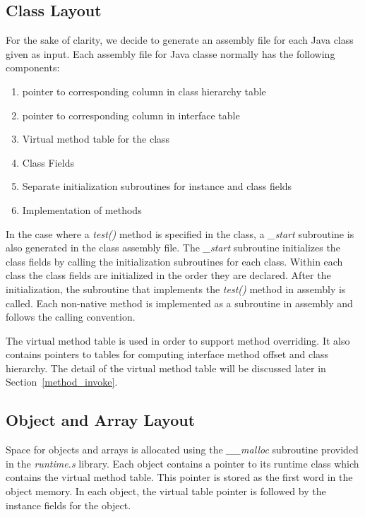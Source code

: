 \documentclass[a4paper, notitlepage]{report}
\begin{document}
\subsection{Class Layout}
\label{class_layout}
For the sake of clarity, we decide to generate an assembly file for each Java class given as input. Each assembly file for Java classe normally has the following components:
\begin{enumerate}
\item pointer to corresponding column in class hierarchy table
\item pointer to corresponding column in interface table
\item Virtual method table for the class
\item Class Fields
\item Separate initialization subroutines for instance and class fields
\item Implementation of methods
\end{enumerate}

In the case where a \emph{test()} method is specified in the class, a \emph{\_start} subroutine is also generated in the class assembly file. The \emph{\_start} subroutine initializes the class fields by calling the initialization subroutines for each class. Within each class the class fields are initialized in the order they are declared. After the initialization, the subroutine that implements the \emph{test()} method in assembly is called. Each non-native method is implemented as a subroutine in assembly and follows the calling convention.

The virtual method table is used in order to support method overriding. It also contains pointers to tables for computing interface method offset and class hierarchy. The detail of the virtual method table will be discussed later in Section~\ref{method_invoke}. 



\subsection{Object and Array Layout}
\label{object_layout}
Space for objects and arrays is allocated using the \emph{\_\_malloc} subroutine provided in the \emph{runtime.s} library. Each object contains a pointer to its runtime class which contains the virtual method table. This pointer is stored as the first word in the object memory. In each object, the virtual table pointer is followed by the instance fields for the object.
\end{document}
